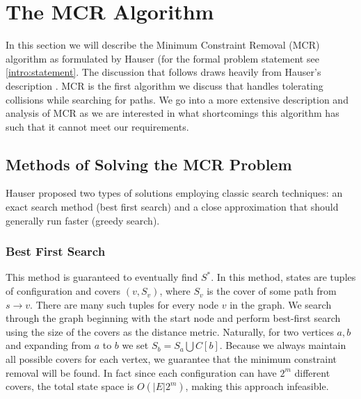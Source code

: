 {}

\section{The MCR Algorithm}
In this section we will describe the Minimum Constraint Removal (MCR) algorithm as formulated by Hauser (for the formal problem statement see \ref{intro:statement}. The discussion that follows draws heavily from Hauser's description . MCR is the first algorithm we discuss that handles tolerating collisions while searching for paths. We go into a more extensive description and analysis of MCR as we are interested in what shortcomings this algorithm has such that it cannot meet our requirements.

\subsection{Methods of Solving the MCR Problem}
Hauser proposed two types of solutions employing classic search techniques: an exact search method (best first search) and a close approximation that should generally run faster (greedy search).

\subsubsection{Best First Search}
This method is guaranteed to eventually find $S^{*}$. In this method, states are tuples of configuration and covers $(v, S_v)$, where $S_v$ is the cover of some path from $s \rightarrow v$. There are many such tuples for every node $v$ in the graph. We search through the graph beginning with the start node and perform best-first search using the size of the covers as the distance metric. Naturally, for two vertices $a, b$ and expanding from $a$ to $b$ we set $S_b = S_a \bigcup C[b]$. Because we always maintain all possible covers for each vertex, we guarantee that the minimum constraint removal will be found. In fact since each configuration can have $2^m$ different covers, the total state space is $O(|E|2^m)$, making this approach infeasible.

